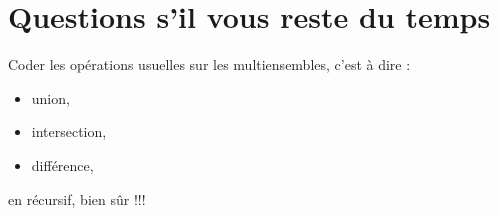 \documentclass[final, pdftex, a4paper, openbib, ]{article}
\begin{document}
\section{Questions s’il vous reste du temps}
Coder les opérations usuelles sur les multiensembles, c'est à dire :
	\begin{itemize}
		\item union,
		\item intersection,
		\item différence,
	\end{itemize}
en récursif, bien sûr !!!
\end{document}
